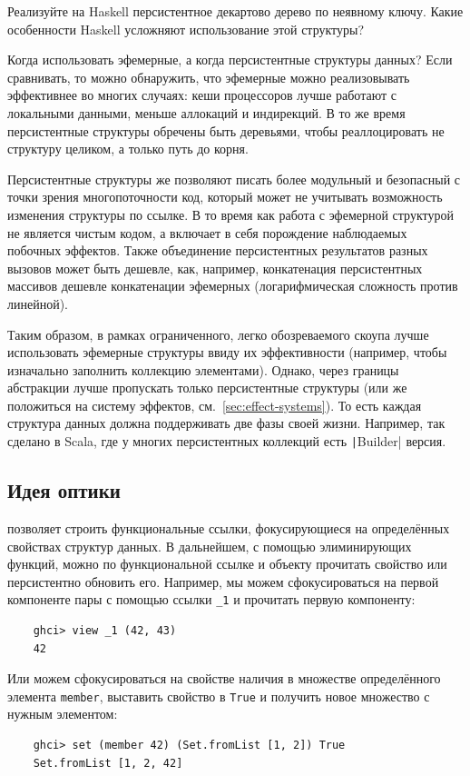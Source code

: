 \begin{task}
    Реализуйте на Haskell персистентное декартово дерево по неявному ключу.
    Какие особенности Haskell усложняют использование этой структуры?
\end{task}

Когда использовать эфемерные, а когда персистентные структуры данных?
Если сравнивать, то можно обнаружить, что эфемерные можно реализовывать эффективнее во многих случаях: кеши процессоров лучше работают с локальными данными, меньше аллокаций и индирекций.
В то же время персистентные структуры обречены быть деревьями, чтобы реаллоцировать не структуру целиком, а только путь до корня.

Персистентные структуры же позволяют писать более модульный и безопасный с точки зрения многопоточности код, который может не учитывать возможность изменения структуры по ссылке.
В то время как работа с эфемерной структурой не является чистым кодом, а включает в себя порождение наблюдаемых побочных эффектов.
Также объединение персистентных результатов разных вызовов может быть дешевле, как, например, конкатенация персистентных массивов дешевле конкатенации эфемерных (логарифмическая сложность против линейной).

Таким образом, в рамках ограниченного, легко обозреваемого скоупа лучше использовать эфемерные структуры ввиду их эффективности (например, чтобы изначально заполнить коллекцию элементами).
Однако, через границы абстракции лучше пропускать только персистентные структуры (или же положиться на систему эффектов, см.~\ref{sec:effect-systems}).
То есть каждая структура данных должна поддерживать две фазы своей жизни.
Например, так сделано в Scala, где у многих персистентных коллекций есть \texttt|Builder| версия.

\subsection{Идея оптики}

 позволяет строить функциональные ссылки, фокусирующиеся на определённых свойствах структур данных.
В дальнейшем, с помощью элиминирующих функций, можно по функциональной ссылке и объекту прочитать свойство или персистентно обновить его.
Например, мы можем сфокусироваться на первой компоненте пары с помощью ссылки \texttt{\_1} и прочитать первую компоненту:
\begin{verbatim}
    ghci> view _1 (42, 43)
    42
\end{verbatim}
Или можем сфокусироваться на свойстве наличия в множестве определённого элемента \texttt{member}, выставить свойство в \texttt{True} и получить новое множество с нужным элементом:
\begin{verbatim}
    ghci> set (member 42) (Set.fromList [1, 2]) True
    Set.fromList [1, 2, 42]
\end{verbatim}

